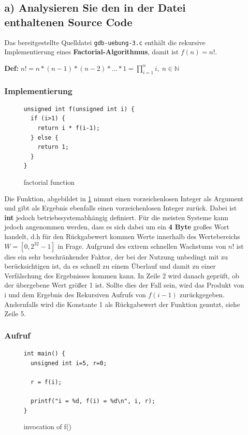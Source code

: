 \documentclass[12pt]{article}
\begin{document}
\subsection{a) Analysieren Sie den in der Datei enthaltenen Source Code}
Das bereitgestellte Quelldatei \texttt{gdb-uebung-3.c} enthält die rekursive Implementierung eines \textbf{Factorial-Algorithmus}, damit ist $f(n) = n! $.

\textbf{Def:} $ n! = n * (n-1) * (n-2) * ... * 1 = \prod_{i = 1}^{n} i ,\;  n \in \mathbb{N} $

\subsubsection{Implementierung}
\begin{figure}[h]
\begin{lstlisting}
unsigned int f(unsigned int i) {
  if (i>1) {
    return i * f(i-1);
  } else {
    return 1;
  }
}
\end{lstlisting}
\label{fig:factorial}
\caption{factorial function}
\end{figure}

Die Funktion, abgebildet in \ref{fig:factorial} nimmt einen vorzeichenlosen Integer als Argument und gibt als Ergebnis ebenfalls einen vorzeichenlosen Integer zurück. Dabei ist \textbf{int} jedoch betriebssystemabhängig definiert. Für die meisten Systeme kann jedoch angenommen werden, dass es sich dabei um ein \textbf{4 Byte} großes Wort handelt, d.h für den Rückgabewert kommen Werte innerhalb des Wertebereichs $  W = [0,2^{32}-1] $ in Frage. Aufgrund des extrem schnellen Wachstums von $ n! $ ist dies ein sehr beschränkender Faktor, der bei der Nutzung unbedingt mit zu berücksichtigen ist, da es schnell zu einem Überlauf und damit zu einer Verfälschung des Ergebnisses kommen kann. In Zeile 2 wird danach geprüft, ob der übergebene Wert größer 1 ist. Sollte dies der Fall sein, wird das  Produkt von i und dem Ergebnis des Rekursiven Aufrufs von $ f(i-1) $ zurückgegeben. Andernfalls wird die Konstante 1 als Rückgabewert der Funktion genutzt, siehe Zeile 5.
\newpage

\subsubsection{Aufruf}
\begin{figure}[h]
\begin{lstlisting}
int main() {
  unsigned int i=5, r=0;

  r = f(i);

  printf("i = %d, f(i) = %d\n", i, r);
}
\end{lstlisting}
\label{fig:factorial-main}
\caption{invocation of f()}
\end{figure}
\end{document}
